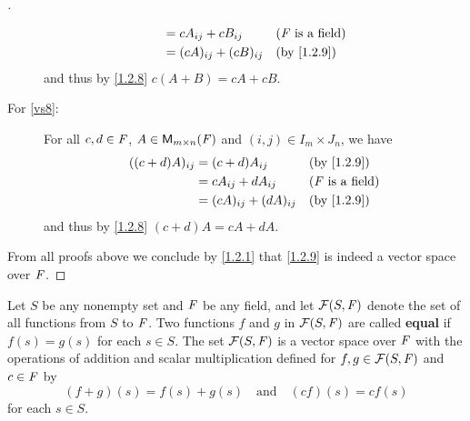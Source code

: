 \begin{proof}[]
\begin{description}
\begin{align*}
                          & = c A_{i j} + c B_{i j}   &  & \text{(\(\F\) is a field)} \\
                          & = (cA)_{i j} + (cB)_{i j} &  & \by{1.2.9}
      \end{align*}
      and thus by \cref{1.2.8} \(c (A + B) = cA + cB\).
    \item[For \ref{vs8}:]
      For all \(c, d \in \mathit{F}\), \(A \in \ms\) and \((i, j) \in I_m \times J_n\), we have
      \begin{align*}
        ((c + d) A)_{i j} & = (c + d) A_{i j}         &  & \by{1.2.9}                 \\
                          & = c A_{i j} + d A_{i j}   &  & \text{(\(\F\) is a field)} \\
                          & = (cA)_{i j} + (dA)_{i j} &  & \by{1.2.9}
      \end{align*}
      and thus by \cref{1.2.8} \((c + d) A = cA + dA\).
  \end{description}
  From all proofs above we conclude by \cref{1.2.1} that \cref{1.2.9} is indeed a vector space over \(\mathit{F}\).
\end{proof}

\begin{eg}\label{1.2.10}
  Let \(S\) be any nonempty set and \(\mathit{F}\) be any field, and let \(\mathcal{F}(S, \mathit{F})\) denote the set of all functions from \(S\) to \(\mathit{F}\).
  Two functions \(f\) and \(g\) in \(\mathcal{F}(S, \mathit{F})\) are called \textbf{equal} if \(f(s) = g(s)\) for each \(s \in S\).
  The set \(\mathcal{F}(S, \mathit{F})\) is a vector space over \(\mathit{F}\) with the operations of addition and scalar multiplication defined for \(f, g \in \mathcal{F}(S, \mathit{F})\) and \(c \in \mathit{F}\) by
  \[
    (f + g)(s) = f(s) + g(s) \quad \text{and} \quad (cf)(s) = cf(s)
  \]
  for each \(s \in S\).
\end{eg}

